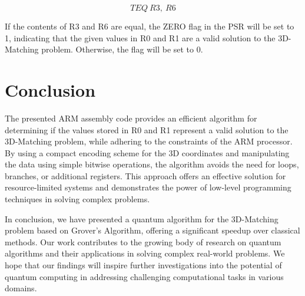 \begin{equation}
  TEQ\ R3,\ R6
\end{equation}

If the contents of R3 and R6 are equal, the ZERO flag in the PSR will be set to 1, indicating that the given values in R0 and R1 are a valid solution to the 3D-Matching problem. Otherwise, the flag will be set to 0.

\section{Conclusion}

The presented ARM assembly code provides an efficient algorithm for determining if the values stored in R0 and R1 represent a valid solution to the 3D-Matching problem, while adhering to the constraints of the ARM processor. By using a compact encoding scheme for the 3D coordinates and manipulating the data using simple bitwise operations, the algorithm avoids the need for loops, branches, or additional registers. This approach offers an effective solution for resource-limited systems and demonstrates the power of low-level programming techniques in solving complex problems.

In conclusion, we have presented a quantum algorithm for the 3D-Matching problem based on Grover's Algorithm, offering a significant speedup over classical methods. Our work contributes to the growing body of research on quantum algorithms and their applications in solving complex real-world problems. We hope that our findings will inspire further investigations into the potential of quantum computing in addressing challenging computational tasks in various domains.

